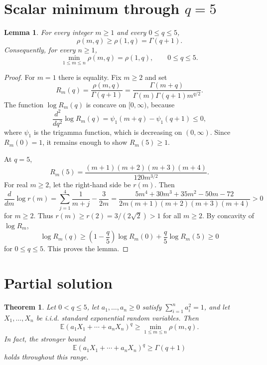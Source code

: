 \documentclass[11pt]{article}
\newtheorem{theorem}{Theorem}
\newtheorem{lemma}{Lemma}
\newcommand{\E}{\mathbb{E}}
\begin{document}
\section{Scalar minimum through \(q=5\)}

\begin{lemma}\label{lem:rho-min}
For every integer \(m\ge 1\) and every \(0\le q\le 5\),
\[
\rho(m,q)\ge \rho(1,q)=\Gamma(q+1).
\]
Consequently, for every \(n\ge 1\),
\[
\min_{1\le m\le n}\rho(m,q)=\rho(1,q),\qquad 0\le q\le 5.
\]
\end{lemma}

\begin{proof}
For \(m=1\) there is equality.  Fix \(m\ge 2\) and set
\[
R_m(q)=\frac{\rho(m,q)}{\Gamma(q+1)}
 =\frac{\Gamma(m+q)}{\Gamma(m)\Gamma(q+1)m^{q/2}}.
\]
The function \(\log R_m(q)\) is concave on \([0,\infty)\), because
\[
\frac{d^2}{dq^2}\log R_m(q)=\psi_1(m+q)-\psi_1(q+1)\le 0,
\]
where \(\psi_1\) is the trigamma function, which is decreasing on
\((0,\infty)\).  Since \(R_m(0)=1\), it remains enough to show \(R_m(5)\ge 1\).

At \(q=5\),
\[
R_m(5)=\frac{(m+1)(m+2)(m+3)(m+4)}{120m^{3/2}}.
\]
For real \(m\ge 2\), let the right-hand side be \(r(m)\).  Then
\[
\frac{d}{dm}\log r(m)
=\sum_{j=1}^4\frac{1}{m+j}-\frac{3}{2m}
=\frac{5m^4+30m^3+35m^2-50m-72}
{2m(m+1)(m+2)(m+3)(m+4)} >0
\]
for \(m\ge 2\).  Thus \(r(m)\ge r(2)=3/(2\sqrt2)>1\) for all \(m\ge 2\).
By concavity of \(\log R_m\),
\[
\log R_m(q)\ge \left(1-\frac q5\right)\log R_m(0)
 + \frac q5\log R_m(5)\ge 0
\]
for \(0\le q\le 5\).  This proves the lemma.
\end{proof}

\section{Partial solution}

\begin{theorem}\label{thm:q-le-five}
Let \(0<q\le 5\), let \(a_1,\ldots,a_n\ge 0\) satisfy
\(\sum_{i=1}^n a_i^2=1\), and let \(X_1,\ldots,X_n\) be i.i.d. standard
exponential random variables.  Then
\[
\E(a_1X_1+\cdots+a_nX_n)^q
\ge \min_{1\le m\le n}\rho(m,q).
\]
In fact, the stronger bound
\[
\E(a_1X_1+\cdots+a_nX_n)^q\ge \Gamma(q+1)
\]
holds throughout this range.
\end{theorem}
\end{document}
